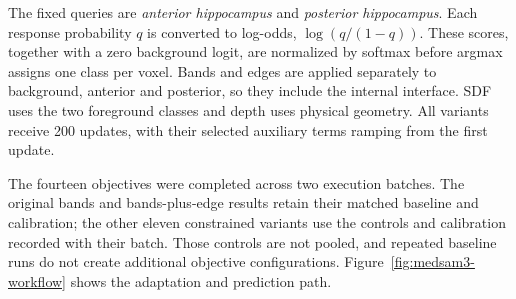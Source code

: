 \documentclass[12pt,a4paper]{article}
\begin{document}
The fixed queries are \emph{anterior hippocampus} and \emph{posterior
hippocampus}. Each response probability $q$ is converted to log-odds,
$\log(q/(1-q))$. These scores, together with a zero background logit, are
normalized by softmax before argmax assigns one class per voxel. Bands and
edges are applied separately to background, anterior and posterior, so they
include the internal interface. SDF uses the two foreground classes and
depth uses physical geometry. All variants receive 200 updates, with their
selected auxiliary terms ramping from the first update.

The fourteen objectives were completed across two execution batches.
The original bands and bands-plus-edge results retain their matched
baseline and calibration; the other eleven constrained variants use
the controls and calibration recorded with their batch. Those controls
are not pooled, and repeated baseline runs do not create additional
objective configurations.
Figure~\ref{fig:medsam3-workflow} shows the adaptation and prediction
path.
\end{document}
